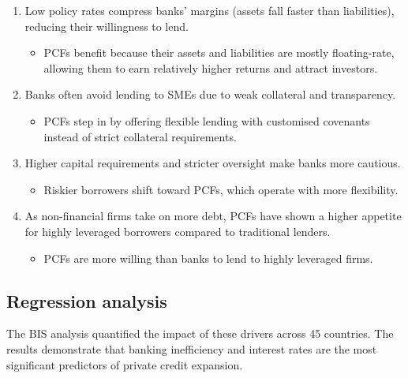 \begin{enumerate}
\item {} Low policy rates compress banks' margins (assets fall faster
than liabilities), reducing their willingness to lend.
  \begin{itemize}
  \item PCFs benefit because their assets and liabilities are mostly floating-rate, allowing
  them to earn relatively higher returns and attract investors.
  \end{itemize}
\item {} Banks often avoid lending to SMEs due to
weak collateral and transparency.
  \begin{itemize}
  \item PCFs step in by offering flexible lending with customised covenants instead of strict
  collateral requirements.
  \end{itemize}
\item {} Higher capital requirements and stricter oversight make
banks more cautious.
  \begin{itemize}
  \item Riskier borrowers shift toward PCFs, which operate with more flexibility.
  \end{itemize}
\item {} As non-financial firms take on more debt, PCFs have shown a
higher appetite for highly leveraged borrowers compared to traditional lenders.
  \begin{itemize}
  \item PCFs are more willing than banks to lend to highly leveraged firms.
  \end{itemize}
\end{enumerate}

\subsection*{Regression analysis}

The BIS analysis quantified the impact of these drivers across 45 countries. The results
demonstrate that banking inefficiency and interest rates are the most significant predictors
of private credit expansion.

